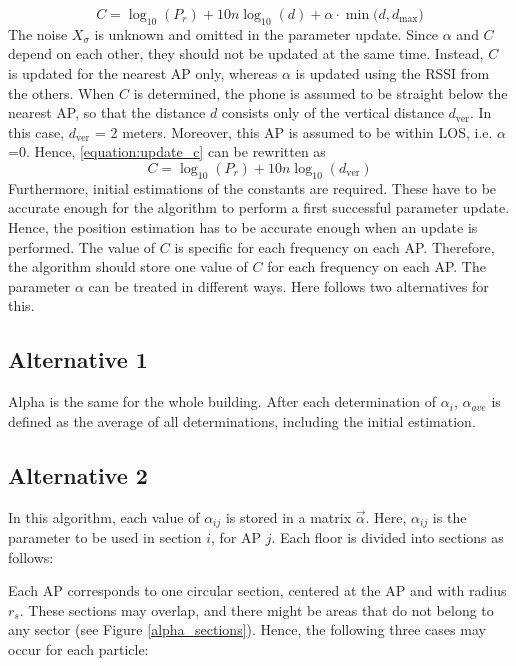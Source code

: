 \documentclass{LTHthesis}
\begin{document}
%
\begin{equation}
C = \log_{10}(P_r)+10n\log_{10}(d)+\alpha\cdot\min({d, d_{\text{max}})}
\label{equation:update_c}
\end{equation}
%
The noise $X_\sigma$ is unknown and omitted in the parameter update. 
%
Since $\alpha$ and $C$ depend on each other, they should not be updated at the same time. Instead, $C$ is updated for the nearest AP only, whereas $\alpha$ is updated using the RSSI from the others. When $C$ is determined, the phone is assumed to be straight below the nearest AP, so that the distance $d$ consists only of the vertical distance $d_{\text{ver}}$. In this case, $d_{\text{ver}}$ = 2 meters. Moreover, this AP is assumed to be within LOS, i.e. $\alpha$=0. Hence, \ref{equation:update_c} can be rewritten as
%
\begin{equation}
C = \log_{10}(P_r)+10n\log_{10}(d_{\text{ver}})
\label{equation:update_c_simple}
\end{equation}
%
Furthermore, initial estimations of the constants are required. These have to be accurate enough for the algorithm to perform a first successful parameter update. Hence, the position estimation has to be accurate enough when an update is performed. 
%
The value of $C$ is specific for each frequency on each AP. Therefore, the algorithm should store one value of $C$ for each frequency on each AP.
The parameter $\alpha$ can be treated in different ways. Here follows two alternatives for this.

\subsection{Alternative 1}
Alpha is the same for the whole building. After each determination of $\alpha_i$, $\alpha_{ave}$ is defined as the average of all determinations, including the initial estimation.


%
\subsection{Alternative 2}
In this algorithm, each value of $\alpha_{ij}$ is stored in a matrix $\vec{\alpha}$. Here, $\alpha_{ij}$ is the parameter to be used in section $i$, for AP $j$. Each floor is divided into sections as follows:

Each AP corresponds to one circular section, centered at the AP and with radius $r_s$. These sections may overlap, and there might be areas that do not belong to any sector (see Figure \ref{alpha_sections}). Hence, the following three cases may occur for each particle:
\end{document}
